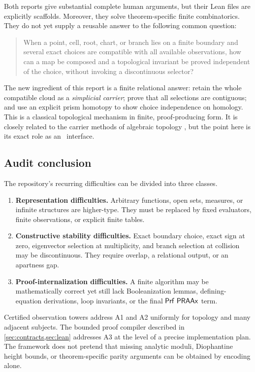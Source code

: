 Both reports give substantial complete human arguments, but their Lean files are explicitly scaffolds.  Moreover, they solve theorem-specific finite combinatorics.  They do not yet supply a reusable answer to the following common question:

\begin{quote}
When a point, cell, root, chart, or branch lies on a finite boundary and several exact choices are compatible with all available observations, how can a map be composed and a topological invariant be proved independent of the choice, without invoking a discontinuous selector?
\end{quote}

The new ingredient of this report is a finite relational answer: retain the whole compatible cloud as a \emph{simplicial carrier}; prove that all selections are contiguous; and use an explicit prism homotopy to show choice independence on homology.  This is a classical topological mechanism in finite, proof-producing form.  It is closely related to the carrier methods of algebraic topology \cite{Munkres}, but the point here is its exact role as an \ipra\ interface.

\subsection{Audit conclusion}

The repository's recurring difficulties can be divided into three classes.

\begin{enumerate}[label=\textbf{A\arabic*.},leftmargin=2.5em]
  \item \textbf{Representation difficulties.}  Arbitrary functions, open sets, measures, or infinite structures are higher-type.  They must be replaced by fixed evaluators, finite observations, or explicit finite tables.
  \item \textbf{Constructive stability difficulties.}  Exact boundary choice, exact sign at zero, eigenvector selection at multiplicity, and branch selection at collision may be discontinuous.  They require overlap, a relational output, or an apartness gap.
  \item \textbf{Proof-internalization difficulties.}  A finite algorithm may be mathematically correct yet still lack Booleanization lemmas, defining-equation derivations, loop invariants, or the final $\mathsf{Prf}\ \mathsf{PRAAx}$ term.
\end{enumerate}

Certified observation towers address A1 and A2 uniformly for topology and many adjacent subjects.  The bounded proof compiler described in \cref{sec:contracts,sec:lean} addresses A3 at the level of a precise implementation plan.  The framework does not pretend that missing analytic moduli, Diophantine height bounds, or theorem-specific parity arguments can be obtained by encoding alone.
